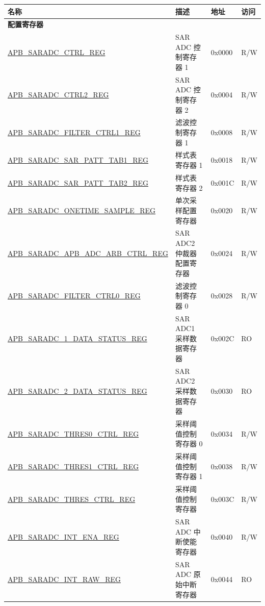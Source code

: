 \begin{longtable}{ | p{7cm} | p{5.2cm} | p{1.3cm} | p{1cm} | }
\hline\rowcolor{lightgray}
名称 & 描述 & 地址 & 访问 \\ \hline
\endhead
\multicolumn{4}{|l|}{\textbf{配置寄存器}} \\ \hline
\hyperref[regdesc:APBSARADCCTRLREG]{APB\_SARADC\_CTRL\_REG} & SAR ADC 控制寄存器 1 & 0x0000 & R/W \\ \hline
\hyperref[regdesc:APBSARADCCTRL2REG]{APB\_SARADC\_CTRL2\_REG} & SAR ADC 控制寄存器 2 & 0x0004 & R/W \\ \hline
\hyperref[regdesc:APBSARADCFILTERCTRL1REG]{APB\_SARADC\_FILTER\_CTRL1\_REG} & 滤波控制寄存器 1 & 0x0008 & R/W \\ \hline
\hyperref[regdesc:APBSARADCSARPATTTAB1REG]{APB\_SARADC\_SAR\_PATT\_TAB1\_REG} & 样式表寄存器 1 & 0x0018 & R/W \\ \hline
\hyperref[regdesc:APBSARADCSARPATTTAB2REG]{APB\_SARADC\_SAR\_PATT\_TAB2\_REG} & 样式表寄存器 2 & 0x001C & R/W \\ \hline
\hyperref[regdesc:APBSARADCONETIMESAMPLEREG]{APB\_SARADC\_ONETIME\_SAMPLE\_REG} & 单次采样配置寄存器 & 0x0020 & R/W \\ \hline
\hyperref[regdesc:APBSARADCARBCTRLREG]{APB\_SARADC\_APB\_ADC\_ARB\_CTRL\_REG} & SAR ADC2 仲裁器配置寄存器 & 0x0024 & R/W \\ \hline
\hyperref[regdesc:APBSARADCFILTERCTRL0REG]{APB\_SARADC\_FILTER\_CTRL0\_REG} & 滤波控制寄存器 0 & 0x0028 & R/W \\ \hline
\hyperref[regdesc:APBSARADCSAR1DATASTATUSREG]{APB\_SARADC\_1\_DATA\_STATUS\_REG} & SAR ADC1 采样数据寄存器 & 0x002C & RO \\ \hline
\hyperref[regdesc:APBSARADCSAR2DATASTATUSREG]{APB\_SARADC\_2\_DATA\_STATUS\_REG} & SAR ADC2 采样数据寄存器 & 0x0030 & RO \\ \hline
\hyperref[regdesc:APBSARADCTHRES0CTRLREG]{APB\_SARADC\_THRES0\_CTRL\_REG} & 采样阈值控制寄存器 0 & 0x0034 & R/W \\ \hline
\hyperref[regdesc:APBSARADCTHRES1CTRLREG]{APB\_SARADC\_THRES1\_CTRL\_REG} & 采样阈值控制寄存器 1 & 0x0038 & R/W \\ \hline
\hyperref[regdesc:APBSARADCTHRESCTRLREG]{APB\_SARADC\_THRES\_CTRL\_REG} & 采样阈值控制寄存器 & 0x003C & R/W \\ \hline
\hyperref[regdesc:APBSARADCINTENAREG]{APB\_SARADC\_INT\_ENA\_REG} & SAR ADC 中断使能寄存器 & 0x0040 & R/W \\ \hline
\hyperref[regdesc:APBSARADCINTRAWREG]{APB\_SARADC\_INT\_RAW\_REG} & SAR ADC 原始中断寄存器 & 0x0044 & RO \\ \hline

\end{longtable}
